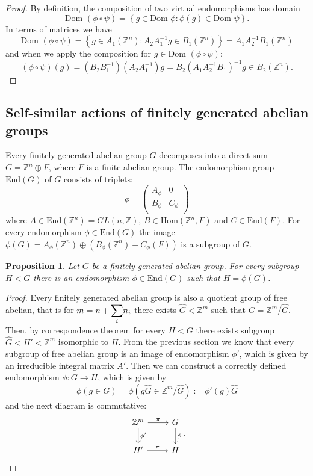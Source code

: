 \documentclass[a4paper,12pt]{amsart}
\newtheorem{proposition}[theorem]{Proposition}
\theoremstyle{definition}
\newcommand{\Dom}{\text{Dom }}
\newcommand{\End}{\text{End}}
\newcommand{\Hom}{\text{Hom}}
\begin{document}
	\begin{proof}
		By definition, the composition of two virtual endomorphisms has domain 
		$$
		\Dom (\phi \circ \psi) = \left\{
			g \in \Dom \phi: \phi (g) \in \Dom \psi
		\right\}.
		$$
		In terms of matrices we have 
		$$
		\Dom (\phi \circ \psi) = \left\{
			g \in A_1(\mathbb{Z}^n) : A_2A_1^{-1}g \in B_1(\mathbb{Z}^n)
		\right\} = A_1A_2^{-1}B_1(\mathbb{Z}^n)
		$$
		and when we apply the composition for $g \in \Dom(\phi \circ \psi)$: 
		$$
		(\phi \circ \psi)(g) = (B_2B_1^{-1})(A_2A_1^{-1})g= B_2(A_1A_2^{-1}B_1)^{-1}g \in B_2(\mathbb{Z}^n).
		$$
	\end{proof}

	\subsection{Self-similar actions of finitely generated abelian groups}  
	Every finitely generated abelian group $G$ decomposes into a direct sum $G = \mathbb{Z}^n \oplus F$, where $F$ is a finite abelian group. The endomorphism group $\End(G)$ of $G$ consists of triplets: 
	\begin{equation} \label{eq:general form of virt_end of finit-gen abelian}
		\phi = \begin{pmatrix}
			A_\phi & 0 \\ 
			B_\phi & C_\phi \\
		\end{pmatrix}
	\end{equation} 
	where $A\in \End(\mathbb{Z}^n) = GL(n, \mathbb{Z})$, $B \in \Hom(\mathbb{Z}^n, F)$ and $C \in \End(F)$. For every endomorphism $\phi \in \End(G)$ the image $\phi(G) = A_\phi(\mathbb{Z}^n) \oplus (B_\phi(\mathbb{Z}^n) + C_\phi(F))$ is a subgroup of $G$. 
	
	\begin{proposition} \label{prop: image of endomorphism}
		Let $G$ be a finitely generated abelian group. For every subgroup $H < G$ there is an endomorphism $\phi \in \End(G)$ such that $H = \phi(G)$. 
	\end{proposition}
	
	
	\begin{proof}
		Every finitely generated abelian group is also a quotient group of free abelian, that is for $m = n + \mathlarger\sum_i n_i $ there exists $\hat{G} < \mathbb{Z}^m$ such that $G = \mathbb{Z}^m / \hat{G}$. Then, by correspondence theorem for every $H < G$ there exists subgroup $\hat{G} < H' < \mathbb{Z}^m$ isomorphic to $H$. From the previous section we know that every subgroup of free abelian group is an image of endomorphism $\phi'$, which is given by an irreducible integral matrix $A'$. Then we can construct a correctly defined endomorphism $\phi : G \rightarrow H$, which is given by
		$$
		\phi(g \in G) = \phi\left(g\hat{G} \in \mathbb{Z}^m / \hat{G}\right) := \phi'(g)\hat{G}
		$$
		and the next diagram is commutative: 
		$$	
		\begin{tikzcd}
			\mathbb{Z}^m \arrow{r}{\pi} \arrow{d}{\phi'} & G \arrow{d}{\phi} \\
			H' \arrow{r}{\pi} & H
		\end{tikzcd}.
		$$
	\end{proof}
		
\end{document}

